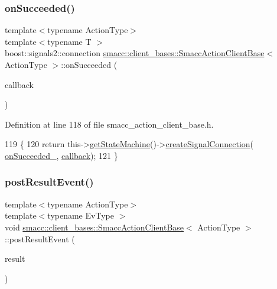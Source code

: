 \subsubsection{\texorpdfstring{on\+Succeeded()}{onSucceeded()}\hspace{0.1cm}{\footnotesize\ttfamily [2/2]}}
{\footnotesize\ttfamily template$<$typename Action\+Type$>$ \\
template$<$typename T $>$ \\
boost\+::signals2\+::connection \hyperlink{classsmacc_1_1client__bases_1_1SmaccActionClientBase}{smacc\+::client\+\_\+bases\+::\+Smacc\+Action\+Client\+Base}$<$ Action\+Type $>$\+::on\+Succeeded (\begin{DoxyParamCaption}\item[{std\+::function$<$ void(Result\+Const\+Ptr \&)$>$}]{callback }\end{DoxyParamCaption})\hspace{0.3cm}{\ttfamily [inline]}}



Definition at line 118 of file smacc\+\_\+action\+\_\+client\+\_\+base.\+h.


\begin{DoxyCode}
119     \{
120         \textcolor{keywordflow}{return} this->\hyperlink{classsmacc_1_1ISmaccClient_aec51d4712404cb9882b86e4c854bb93a}{getStateMachine}()->\hyperlink{classsmacc_1_1ISmaccStateMachine_adf0f42ade0c65cc471960fe2a7c42da2}{createSignalConnection}(
      \hyperlink{classsmacc_1_1client__bases_1_1SmaccActionClientBase_afa1d615e16c9e825d815a3a3ccaa61df}{onSucceeded\_}, \hyperlink{sm__ridgeback__barrel__search__1_2servers_2opencv__perception__node_2opencv__perception__node_8cpp_a050e697bd654facce10ea3f6549669b3}{callback});
121     \}
\end{DoxyCode}
\mbox{\label{classsmacc_1_1client__bases_1_1SmaccActionClientBase_ad84470e029cc996685f44ad0d4062c29}} 
\subsubsection{\texorpdfstring{post\+Result\+Event()}{postResultEvent()}}
{\footnotesize\ttfamily template$<$typename Action\+Type$>$ \\
template$<$typename Ev\+Type $>$ \\
void \hyperlink{classsmacc_1_1client__bases_1_1SmaccActionClientBase}{smacc\+::client\+\_\+bases\+::\+Smacc\+Action\+Client\+Base}$<$ Action\+Type $>$\+::post\+Result\+Event (\begin{DoxyParamCaption}\item[{Result\+Const\+Ptr}]{result }\end{DoxyParamCaption})\hspace{0.3cm}{\ttfamily [inline]}}



